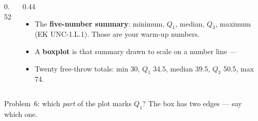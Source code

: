 \documentclass[aspectratio=169, 11pt]{beamer}
\begin{document}
\begin{frame}[t, plain]
  \vspace{2pt}
  \begin{columns}[t]
    \begin{column}{0.52\textwidth}
      \begin{center}
      \end{center}
    \end{column}
    \begin{column}{0.44\textwidth}
      \begin{itemize}\setlength{\itemsep}{6pt}
        \item The \textbf{five-number summary}: minimum, $Q_1$, median, $Q_3$, maximum
              (EK UNC-1.L.1). Those are your warm-up numbers.
        \item A \textbf{boxplot} is that summary drawn to scale on a number line ---
        \item Twenty free-throw totals: min 30, $Q_1$ 34.5, median 39.5, $Q_3$ 50.5, max 74.
      \end{itemize}
    \end{column}
  \end{columns}
  \vspace{6pt}
  \begin{center}
    {\small\color{slate} Problem~6: which \emph{part} of the plot marks $Q_1$? The box has two
    edges --- say which one.}
  \end{center}
\end{frame}
\end{document}
